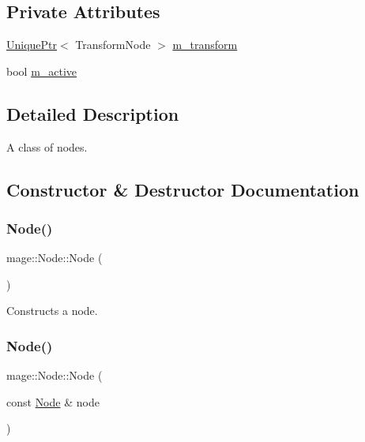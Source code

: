 \subsection*{Private Attributes}
\begin{DoxyCompactItemize}
\item 
\hyperlink{namespacemage_a8c307fbcc33bce9b7f2aa4c26c3b95cf}{Unique\+Ptr}$<$ Transform\+Node $>$ \hyperlink{classmage_1_1_node_a24512023f5f6ec7adad9810e55ec2ab5}{m\+\_\+transform}
\item 
bool \hyperlink{classmage_1_1_node_ac4dd6c399de8b2a92df92365df7ecdac}{m\+\_\+active}
\end{DoxyCompactItemize}


\subsection{Detailed Description}
A class of nodes. 

\subsection{Constructor \& Destructor Documentation}
\hypertarget{classmage_1_1_node_a58b816eaa1dfd3c4b7f14896f190587f}{}\label{classmage_1_1_node_a58b816eaa1dfd3c4b7f14896f190587f} 
\subsubsection{\texorpdfstring{Node()}{Node()}\hspace{0.1cm}{\footnotesize\ttfamily [1/3]}}
{\footnotesize\ttfamily mage\+::\+Node\+::\+Node (\begin{DoxyParamCaption}{ }\end{DoxyParamCaption})}

Constructs a node. \hypertarget{classmage_1_1_node_af9da591163469f210895f3a5b389d7cc}{}\label{classmage_1_1_node_af9da591163469f210895f3a5b389d7cc} 
\subsubsection{\texorpdfstring{Node()}{Node()}\hspace{0.1cm}{\footnotesize\ttfamily [2/3]}}
{\footnotesize\ttfamily mage\+::\+Node\+::\+Node (\begin{DoxyParamCaption}\item[{const \hyperlink{classmage_1_1_node}{Node} \&}]{node }\end{DoxyParamCaption})}

